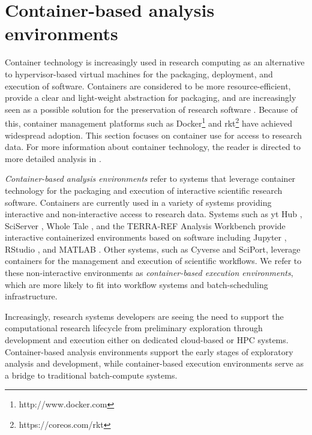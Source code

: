 \documentclass{sig-alternate}
\begin{document}

\section{Container-based analysis environments}

Container technology is increasingly used in research computing as an alternative to hypervisor-based virtual machines for the packaging, deployment, and execution of software. Containers are considered to be more resource-efficient, provide a clear and light-weight abstraction for packaging, and are increasingly seen as a possible solution for the preservation of research software \cite{Meng2015137}.  Because of this, container management platforms such as Docker\footnote{http://www.docker.com} and rkt\footnote{https://coreos.com/rkt} have achieved widespread adoption. This section focuses on container use for access to research data. For more information about container technology, the reader is directed to more detailed analysis in \cite{7036275,7095802,Soltesz:2007:COS:1272998.1273025}. 

\emph{Container-based analysis environments} refer 	to systems that leverage container technology for the packaging and execution of interactive scientific research software. Containers are currently used in a variety of systems providing interactive and non-interactive access to research data. Systems such as yt Hub \cite{zuhone2016galaxy}, SciServer \cite{Medvedev:2016:SCB:2949689.2949700}, Whole Tale \cite{ludaescher2016capturing}, and the TERRA-REF Analysis Workbench \cite{willis_craig_2017_580057} provide interactive containerized environments based on software including Jupyter \cite{kluyver2016jupyter}, RStudio \cite{Rstudio2015}, and MATLAB \cite{mathworks}. Other systems, such as Cyverse\cite{devisetty2016bringing} and SciPort\cite{Gerlach:2014:SCE:2689676.2689680}, leverage containers for the management and execution of scientific workflows. We refer to these non-interactive environments as \emph{container-based execution environments}, which are more likely to fit into workflow systems and batch-scheduling infrastructure.  

Increasingly, research systems developers are seeing the need to support the computational research lifecycle from preliminary exploration through development and execution either on dedicated cloud-based or HPC systems. Container-based analysis environments support the early stages of exploratory analysis and development, while container-based execution environments serve as a bridge to traditional batch-compute systems.
\end{document}
